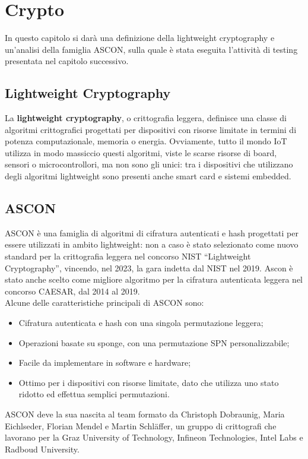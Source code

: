 \chapter{Crypto}

In questo capitolo si darà una definizione della lightweight cryptography e un'analisi della famiglia ASCON, sulla quale è stata eseguita l'attività di testing presentata nel capitolo successivo.

\section{Lightweight Cryptography}

La \textbf{lightweight cryptography}, o crittografia leggera, definisce una classe di algoritmi crittografici progettati per dispositivi con risorse limitate in termini di potenza computazionale, memoria o energia. Ovviamente, tutto il mondo IoT utilizza in modo massiccio questi algoritmi, viste le scarse risorse di board, sensori o microcontrollori, ma non sono gli unici: tra i dispositivi che utilizzano degli algoritmi lightweight sono presenti anche smart card e sistemi embedded.

\section{ASCON}

ASCON è una famiglia di algoritmi di cifratura autenticati e hash progettati per essere utilizzati in ambito lightweight: non a caso è stato selezionato come nuovo standard per la crittografia leggera nel concorso NIST ``Lightweight Cryptography'',
vincendo, nel 2023, la gara indetta dal NIST nel 2019. Ascon è stato anche scelto come migliore algoritmo per la cifratura autenticata leggera nel concorso CAESAR, dal 2014 al 2019\cite{ascon-overview}. \\

\noindent Alcune delle caratteristiche principali di ASCON sono:
\begin{itemize}
    \item Cifratura autenticata e hash con una singola permutazione leggera;
    \item Operazioni basate su sponge, con una permutazione SPN personalizzabile;
    \item Facile da implementare in software e hardware;
    \item Ottimo per i dispositivi con risorse limitate, dato che utilizza uno stato ridotto ed effettua semplici permutazioni.
\end{itemize}
\noindent ASCON deve la sua nascita al team formato da Christoph Dobraunig, Maria Eichlseder, Florian Mendel e Martin Schläffer\cite{ascon-contact}, un gruppo di crittografi che lavorano per la Graz University of Technology, Infineon Technologies, Intel Labs e Radboud University\cite{ascon-overview}.


